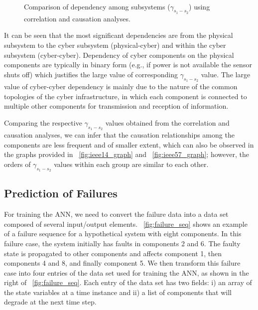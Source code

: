 \documentclass[12pt]{elsarticle}
\begin{document}
\begin{figure}
\centering
{}
~
\caption{Comparison of dependency among subsystems ($\gamma_{s_1-s_2}$) using correlation and causation analyses.}
\label{fig:gamma}
\end{figure}

It can be seen that the most significant dependencies are from the physical subsystem to the cyber subsystem (physical-cyber) and within the cyber subsystem (cyber-cyber). Dependency of cyber components on the physical components are typically in binary form (e.g., if power is not available the sensor shuts off) which justifies the large value of corresponding $\gamma_{s_1-s_2}$ value. The large value of cyber-cyber dependency is mainly due to the nature of the common topologies of the cyber infrastructure, in which each component is connected to multiple other components for transmission and reception of information.

Comparing the respective $\gamma_{s_1-s_2}$ values obtained from the correlation and causation analyses, we can infer that the causation relationships among the components are less frequent and of smaller extent, which can also be observed in the graphs provided in \figurename~\ref{fig:ieee14_graph} and \figurename~\ref{fig:ieee57_graph}; however, the orders of $\gamma_{s_1-s_2}$ values within each group are similar to each other.

\subsection{Prediction of Failures}
\label{sec:case_study:pred}
For training the ANN, we need to convert the failure data into a data set composed of several input/output elements. \figurename~\ref{fig:failure_seq} shows an example of a failure sequence for a hypothetical system with eight components. In this failure case, the system initially has faults in components 2 and 6. The faulty state is propagated to other components and affects component 1, then components 4 and 8, and finally component 5. We then transform this failure case into four entries of the data set used for training the ANN, as shown in the right of \figurename~\ref{fig:failure_seq}. Each entry of the data set has two fields: i) an array of the state variables at a time instance and ii) a list of components that will degrade at the next time step.
\end{document}
